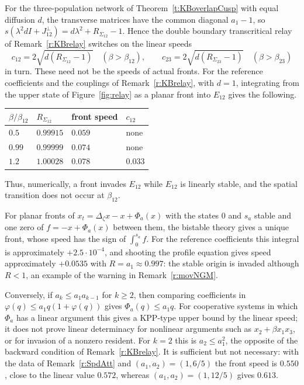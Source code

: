 For the three-population network of Theorem~\ref{t:KBoverlapCusp} with equal diffusion $d$, the transverse matrices have the common diagonal $a_1-1$, so
$s(\lambda^2dI+J_{12}^\perp)=d\lambda^2+R_{\Sigma_{12}}-1$. Hence the double boundary transcritical relay of Remark~\ref{r:KBrelay} switches on the linear speeds
\[
 c_{12}=2\sqrt{d(R_{\Sigma_{12}}-1)}\quad(\beta>\beta_{12}),\qquad c_{23}=2\sqrt{d(R_{\Sigma_{23}}-1)}\quad(\beta>\beta_{23})
\]
in turn. These need not be the speeds of actual fronts. For the reference coefficients and the couplings of Remark~\ref{r:KBrelay}, with $d=1$, integrating from the upper state of
Figure~\ref{fig:relay} as a planar front into $E_{12}$ gives the following.
\begin{center}
\begin{tabular}{llll}
\hline
$\beta/\beta_{12}$ & $R_{\Sigma_{12}}$ & front speed & $c_{12}$\\\hline
$0.5$ & $0.99915$ & $0.059$ & none\\
$0.99$ & $0.99999$ & $0.074$ & none\\
$1.2$ & $1.00028$ & $0.078$ & $0.033$\\\hline
\end{tabular}
\end{center}
Thus, numerically, a front invades $E_{12}$ while $E_{12}$ is linearly stable, and the spatial transition does not occur at $\beta_{12}$.
\eeR

For planar fronts of $x_t=\Delta_\zeta x-x+\Phi_a(x)$ with the states $0$ and $s_a$ stable and one zero of $f=-x+\Phi_a(x)$ between them, the bistable theory \cite{FifeMcLeod1977} gives a unique front, whose
speed has the sign of $\int_0^{s_a}f$. For the reference coefficients this integral is approximately $+2.5\cdot10^{-4}$, and shooting the profile equation gives speed
approximately $+0.0535$ with $R=a_1\approx0.997$: the stable origin is invaded although $R<1$, an example of the warning in Remark~\ref{r:movNGM}.

Conversely, if $a_k\le a_1a_{k-1}$ for $k\ge2$, then comparing coefficients in $\varphi(q)\le a_1q(1+\varphi(q))$ gives $\Phi_a(q)\le a_1q$. For cooperative systems in which $\Phi_a$ has a linear argument this gives a KPP-type upper bound by the linear speed; it does not prove linear determinacy for nonlinear arguments such as $x_2+\beta x_1x_3$, or for invasion of a nonzero resident. For $k=2$ this is $a_2\le a_1^2$, the opposite of the backward condition of Remark~\ref{r:KBrelay}. It is sufficient but not necessary: with the data of
Remark~\ref{r:SpdAtt} and $(a_1,a_2)=(1,6/5)$ the front speed is $0.550$, close to the linear value $0.572$, whereas $(a_1,a_2)=(1,12/5)$ gives $0.613$.
\eeR

